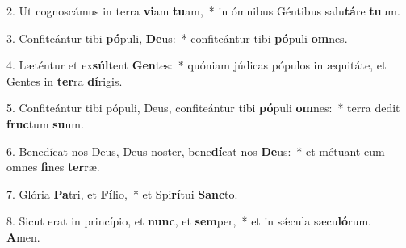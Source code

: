 2. Ut cognoscámus in terra \textbf{vi}am \textbf{tu}am,~*  in ómnibus Géntibus salu\textbf{tá}re \textbf{tu}um.\

3. Confiteántur tibi \textbf{pó}puli, \textbf{De}us:~*  confiteántur tibi \textbf{pó}puli \textbf{om}nes.\

4. Læténtur et ex\textbf{súl}tent \textbf{Gen}tes:~*  quóniam júdicas pópulos in æquitáte, et Gentes in \textbf{ter}ra \textbf{dí}rigis.\

5. Confiteántur tibi pópuli, Deus, confiteántur tibi \textbf{pó}puli \textbf{om}nes:~*  terra dedit \textbf{fruc}tum \textbf{su}um.\

6. Benedícat nos Deus, Deus noster, bene\textbf{dí}cat nos \textbf{De}us:~*  et métuant eum omnes \textbf{fi}nes \textbf{ter}ræ.\

7. Glória \textbf{Pa}tri, et \textbf{Fí}lio,~*  et Spi\textbf{rí}tui \textbf{Sanc}to.\

8. Sicut erat in princípio, et \textbf{nunc}, et \textbf{sem}per,~*  et in sǽcula sæcu\textbf{ló}rum. \textbf{A}men.\

